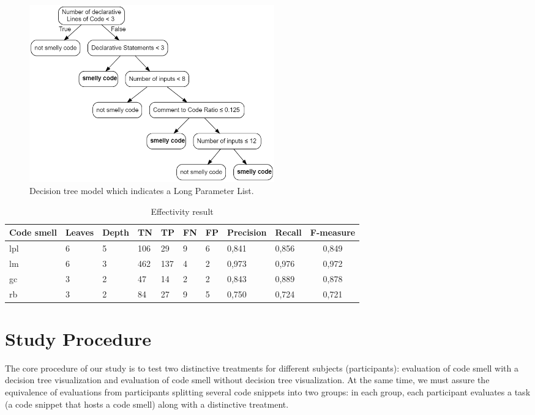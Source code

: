 \begin{figure}[t]
\includegraphics[width=400px]{figures/lpl_detection.png}
\caption{Decision tree model which indicates a Long Parameter List.}
\label{fig:lpl_detecion}
\end{figure}

\begin{table}[t]
\centering
\begin{tabular}{lllllllllc}
\toprule
\textbf{Code smell} &   \textbf{Leaves}    & \textbf{Depth} & \textbf{TN} & \textbf{TP} & \textbf{FN} & \textbf{FP} & \textbf{Precision} & \textbf{Recall} & \textbf{F-measure} \\ 
\toprule
lpl & 6 & 5 & 106 & 29  & 9 & 6 & 0,841 & 0,856 & 0,849  \\
lm  & 6 & 3 & 462 & 137 & 4 & 2 & 0,973 & 0,976 & 0,972  \\
gc  & 3 & 2 & 47  & 14  & 2 & 2 & 0,843 & 0,889 & 0,878  \\
rb  & 3 & 2 & 84  & 27  & 9 & 5 & 0,750 & 0,724 & 0,721 \\
\bottomrule
\end{tabular}
\caption{Effectivity result}
\label{tbl:effectivityTable}
\end{table}

\section{Study Procedure} \label{sec:studyProcedure}

The core procedure of our study is to test two distinctive treatments for different subjects (participants): evaluation of code smell with a decision tree visualization and evaluation of code smell without decision tree visualization. At the same time, we must assure the equivalence of evaluations from participants splitting several code snippets into two groups: in each group, each participant evaluates a task (a code snippet that hosts a code smell) along with a distinctive treatment.

